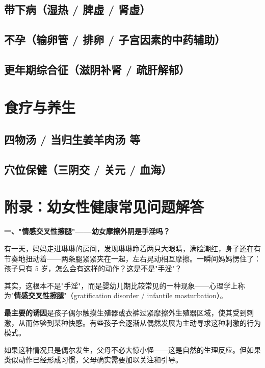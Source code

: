 \begin{enumerate}
\subsection{带下病（湿热 / 脾虚 / 肾虚）}
\subsection{不孕（输卵管 / 排卵 / 子宫因素的中药辅助）}
\subsection{更年期综合征（滋阴补肾 / 疏肝解郁）}

\section{食疗与养生}
\subsection{四物汤 / 当归生姜羊肉汤 等}
\subsection{穴位保健（三阴交 / 关元 / 血海）}


\section*{附录：幼女性健康常见问题解答}

\vspace{0.5em}
\noindent\textbf{一、"情感交叉性擦腿"——幼女摩擦外阴是手淫吗？}

有一天，妈妈走进琳琳的房间，发现琳琳睁着两只大眼睛，满脸潮红，身子还在有节奏地扭动着——两条腿紧紧夹在一起，左右晃动相互摩擦。一瞬间妈妈愣住了：孩子只有 $5$ 岁，怎么会有这样的动作？这是不是"手淫"？

其实，这根本不是"手淫"，而是婴幼儿期比较常见的一种现象——心理学上称为"\textbf{情感交叉性擦腿}"（gratification disorder / infantile masturbation）。

\textbf{最主要的诱因}是孩子偶尔触摸生殖器或衣裤过紧摩擦外生殖器区域，使其受到刺激，从而体验到某种快感。有些孩子会逐渐从偶然发展为主动寻求这种刺激的行为模式。

如果这种情况只是偶尔发生，父母不必大惊小怪——这是自然的生理反应。但如果类似动作已经形成习惯，父母确实需要加以关注和引导。


\end{enumerate}
